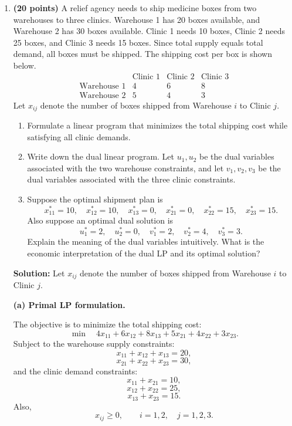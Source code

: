 \documentclass[11pt]{article}
\begin{document}
\begin{enumerate}

\item \textbf{(20 points)} A relief agency needs to ship medicine boxes from two warehouses to three clinics. Warehouse 1 has 20 boxes available, and Warehouse 2 has 30 boxes available. Clinic 1 needs 10 boxes, Clinic 2 needs 25 boxes, and Clinic 3 needs 15 boxes. Since total supply equals total demand, all boxes must be shipped. The shipping cost per box is shown below.
\[
\begin{array}{c|ccc}
& \text{Clinic 1} & \text{Clinic 2} & \text{Clinic 3}\\
\hline
\text{Warehouse 1} & 4 & 6 & 8\\
\text{Warehouse 2} & 5 & 4 & 3
\end{array}
\]
Let $x_{ij}$ denote the number of boxes shipped from Warehouse $i$ to Clinic $j$.

\begin{enumerate}
    \item[(a)] Formulate a linear program that minimizes the total shipping cost while satisfying all clinic demands.

    \item[(b)] Write down the dual linear program. Let $u_1,u_2$ be the dual variables associated with the two warehouse constraints, and let $v_1,v_2,v_3$ be the dual variables associated with the three clinic constraints.

    \item[(c)] Suppose the optimal shipment plan is
    \[
    x_{11}^*=10,\quad x_{12}^*=10,\quad x_{13}^*=0,\quad
    x_{21}^*=0,\quad x_{22}^*=15,\quad x_{23}^*=15.
    \]
    Also suppose an optimal dual solution is
    \[
    u_1^*=2,\quad u_2^*=0,\quad v_1^*=2,\quad v_2^*=4,\quad v_3^*=3.
    \]
    Explain the meaning of the dual variables intuitively. What is the economic interpretation of the dual LP and its optimal solution?
\end{enumerate}

{\color{red}
\textbf{Solution:}
Let $x_{ij}$ denote the number of boxes shipped from Warehouse $i$ to Clinic $j$.

\textbf{(a) Primal LP formulation.}

The objective is to minimize the total shipping cost:
\[
\min \quad
4x_{11}+6x_{12}+8x_{13}
+5x_{21}+4x_{22}+3x_{23}.
\]
Subject to the warehouse supply constraints:
\[
x_{11}+x_{12}+x_{13}=20,
\]
\[
x_{21}+x_{22}+x_{23}=30,
\]
and the clinic demand constraints:
\[
x_{11}+x_{21}=10,
\]
\[
x_{12}+x_{22}=25,
\]
\[
x_{13}+x_{23}=15.
\]
Also,
\[
x_{ij}\geq 0,
\qquad
i=1,2,\quad j=1,2,3.
\]

}
\end{enumerate}
\end{document}
